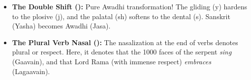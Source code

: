 \begin{tcolorbox}[gotchabox]
\begin{itemize}
    \item \textbf{The Double Shift ():} Pure Awadhi transformation! The gliding  (y) hardens to the plosive  (j), and the palatal  (sh) softens to the dental  (s). Sanskrit  (Yasha) becomes Awadhi  (Jasa).
    \item \textbf{The Plural Verb Nasal ():} The nasalization  at the end of verbs denotes plural or respect. Here, it denotes that the 1000 faces of the serpent \textit{sing} (Gaavain), and that Lord Rama (with immense respect) \textit{embraces} (Lagaavain).
\end{itemize}
\end{tcolorbox}



\newpage
